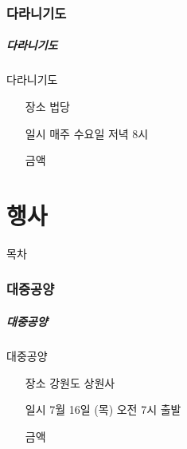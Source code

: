 \documentclass[aspectratio=1610,17pt,xcolor=pdftex,dvipsnames,table,handout]{beamer}
\begin{document}


%
		\section{다라니기도}
		\begin{frame} [t,plain]
		\frametitle{다라니기도}
			\begin{block} {다라니기도 }
			\setlength{\leftmargini}{5em}			
			\begin{itemize}
				\item [장소]	 법당
				\item [일시]	 매주 수요일 저녁 8시
				\item [금액]	
			\end{itemize}
			\end{block}						
		\end{frame}					






		\part{행사}
		\frame{\partpage}
		
		\begin{frame} [plain]{목차}
		\tableofcontents%
		\end{frame}
		

	

	

		\section{대중공양}
		\begin{frame} [t,plain]
		\frametitle{대중공양}
			\begin{block} {대중공양 }
			\setlength{\leftmargini}{5em}			
			\begin{itemize}
				\item [장소]	 강원도 상원사
				\item [일시]	7월 16일 (목) 오전 7시 출발
				\item [금액]	
			\end{itemize}
			\end{block}						
		\end{frame}					
\end{document}
